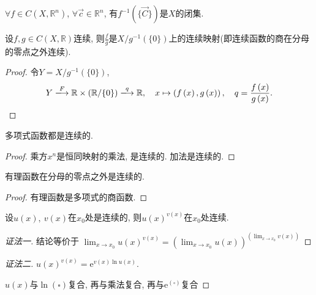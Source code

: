 \begin{proposition}
    $\forall f \in C\left( X , \mathbb{R}^{n} \right) $, $\forall \vec{c} \in \mathbb{R}^{n}$, 有$f^{-1} \left( \{ \vec{C} \} \right) $是$X$的闭集.
\end{proposition}

\begin{theorem}
    设$f,g \in  C\left( X, \mathbb{R} \right) $连续, 则$\frac{f}{g}$是$X / g^{-1} \left( \{ 0 \} \right) $上的连续映射(即连续函数的商在分母的零点之外连续).
\end{theorem}
\begin{proof}
    令$Y = X / g^{-1}\left( \{ 0 \} \right) $,
    \begin{equation}
      Y \xlongrightarrow{F} \mathbb{R} \times \left( \mathbb{R} / \{ 0 \} \right) \xlongrightarrow{q} \mathbb{R},\quad x \mapsto \left( f\left( x \right) ,g\left( x \right)  \right), \quad q = \frac{f\left( x \right) }{g\left( x \right) }.
    \end{equation}
\end{proof}

\begin{example}
    多项式函数都是连续的.
\end{example}
\begin{proof}
    乘方$x^{n}$是恒同映射的乘法, 是连续的. 加法是连续的.
\end{proof}

\begin{example}
    有理函数在分母的零点之外是连续的.
\end{example}
\begin{proof}
    有理函数是多项式的商函数.
\end{proof}

\begin{proposition}
    设$u\left( x \right) , \ v\left( x \right) $在$x_0$处是连续的, 则$u\left( x \right) ^{v\left( x \right)}$在$x_0$处连续.
\end{proposition}
\begin{proof}[证法一]
    结论等价于 $\displaystyle \lim_{x \to x_0} u\left( x \right) ^{v\left( x \right) } = \left( \lim_{x \to x_0} u\left( x \right)  \right)^{\left( \displaystyle  \lim_{x \to x_0} v\left( x \right)  \right) } $
\end{proof}
\begin{proof}[证法二]
    $u\left( x \right) ^{v\left( x \right) } = \mathrm{e}^{v\left( x \right) \ln u\left( x \right) }$.

    $u\left( x \right) $与$\ln(\square)$复合, 再与乘法复合, 再与$\mathrm{e}^{(\square)}$复合
\end{proof}